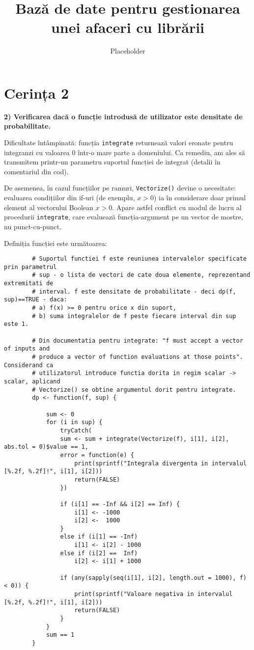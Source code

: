 \documentclass[12pt]{article}
\title{Bază de date pentru gestionarea unei afaceri cu librării}
\author{Placeholder}
\begin{document}
	\section{Cerința 2}
	\textbf{2) Verificarea dacă o funcție introdusă de utilizator este densitate de probabilitate.}\vspace{5mm}
	
	Dificultate întâmpinată: funcția \lstinline|integrate| returnează valori eronate pentru integranzi cu valoarea $0$ într-o mare parte a domeniului. Ca remediu, am ales să transmitem printr-un parametru suportul funcției de integrat (detalii în comentariul din cod).\par
	De asemenea, în cazul funcțiilor pe ramuri, \lstinline|Vectorize()| devine o necesitate: evaluarea condițiilor din if-uri (de exemplu, $x > 0$) ia în considerare doar primul element al vectorului Boolean $x > 0$. Apare astfel conflict cu modul de lucru al procedurii \lstinline|integrate|, care evaluează funcția-argument pe un vector de mostre, nu punct-cu-punct.\par
	Definiția funcției este următoarea: \\
	
	\begin{lstlisting}
		# Suportul functiei f este reuniunea intervalelor specificate prin parametrul
		# sup - o lista de vectori de cate doua elemente, reprezentand extremitati de
		# interval. f este densitate de probabilitate - deci dp(f, sup)==TRUE - daca:
		# a) f(x) >= 0 pentru orice x din suport,
		# b) suma integralelor de f peste fiecare interval din sup este 1.
		
		# Din documentatia pentru integrate: "f must accept a vector of inputs and
		# produce a vector of function evaluations at those points". Considerand ca
		# utilizatorul introduce functia dorita in regim scalar -> scalar, aplicand
		# Vectorize() se obtine argumentul dorit pentru integrate.
		dp <- function(f, sup) {
			
			sum <- 0
			for (i in sup) {
				tryCatch(
				sum <- sum + integrate(Vectorize(f), i[1], i[2], abs.tol = 0)$value == 1,
				error = function(e) {
					print(sprintf("Integrala divergenta in intervalul [%.2f, %.2f]!", i[1], i[2]))
					return(FALSE)
				})
				
				if (i[1] == -Inf && i[2] == Inf) {
					i[1] <- -1000
					i[2] <-  1000
				}
				else if (i[1] == -Inf)
					i[1] <- i[2] - 1000
				else if (i[2] ==  Inf)
					i[2] <- i[1] + 1000
				
				if (any(sapply(seq(i[1], i[2], length.out = 1000), f) < 0)) {
					print(sprintf("Valoare negativa in intervalul [%.2f, %.2f]!", i[1], i[2]))
					return(FALSE)
				}
			}
			sum == 1
		}
	\end{lstlisting}\vspace*{3\baselineskip} 
\end{document}

